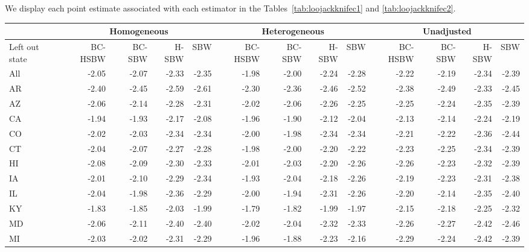 We display each point estimate associated with each estimator in the Tables~\ref{tab:loojackknifec1} and \ref{tab:loojackknifec2}.

\begin{landscape}
\captionsetup[table]{labelformat=empty,skip=1pt}
\begin{table}[H]\caption{Leave one state out jackknife point estimates: all estimators, primary dataset}\label{tab:loojackknifec1}
\centering
\begin{longtable}{lrrrr|rrrr|rrrr}
\hline
 & \multicolumn{4}{c}{Homogeneous} & \multicolumn{4}{c}{Heterogeneous} & \multicolumn{4}{c}{Unadjusted} \\ 
 \hline
Left out state & BC-HSBW & BC-SBW & H-SBW & SBW & BC-HSBW & BC-SBW & H-SBW & SBW & BC-HSBW & BC-SBW & H-SBW & SBW \\ 
\hline
All & -2.05 & -2.07 & -2.33 & -2.35 & -1.98 & -2.00 & -2.24 & -2.28 & -2.22 & -2.19 & -2.34 & -2.39 \\ 
AR & -2.40 & -2.45 & -2.59 & -2.61 & -2.30 & -2.36 & -2.46 & -2.52 & -2.38 & -2.49 & -2.33 & -2.45 \\ 
AZ & -2.06 & -2.14 & -2.28 & -2.31 & -2.02 & -2.06 & -2.26 & -2.25 & -2.25 & -2.24 & -2.35 & -2.39 \\ 
CA & -1.94 & -1.93 & -2.17 & -2.08 & -1.96 & -1.90 & -2.12 & -2.04 & -2.13 & -2.14 & -2.24 & -2.19 \\ 
CO & -2.02 & -2.03 & -2.34 & -2.34 & -2.00 & -1.98 & -2.34 & -2.34 & -2.21 & -2.22 & -2.36 & -2.44 \\ 
CT & -2.04 & -2.07 & -2.27 & -2.28 & -1.98 & -2.00 & -2.20 & -2.22 & -2.23 & -2.25 & -2.34 & -2.39 \\ 
HI & -2.08 & -2.09 & -2.30 & -2.33 & -2.01 & -2.03 & -2.20 & -2.26 & -2.26 & -2.23 & -2.32 & -2.39 \\ 
IA & -2.01 & -2.10 & -2.29 & -2.34 & -1.93 & -2.04 & -2.18 & -2.26 & -2.19 & -2.23 & -2.31 & -2.38 \\ 
IL & -2.04 & -1.98 & -2.36 & -2.29 & -2.00 & -1.94 & -2.31 & -2.26 & -2.20 & -2.14 & -2.35 & -2.40 \\ 
KY & -1.83 & -1.85 & -2.03 & -1.99 & -1.79 & -1.82 & -1.99 & -1.97 & -2.15 & -2.18 & -2.25 & -2.32 \\ 
MD & -2.06 & -2.11 & -2.40 & -2.40 & -2.02 & -2.04 & -2.32 & -2.33 & -2.26 & -2.27 & -2.42 & -2.46 \\ 
MI & -2.03 & -2.02 & -2.31 & -2.29 & -1.96 & -1.88 & -2.23 & -2.16 & -2.29 & -2.24 & -2.42 & -2.39 \\ 

\end{longtable}
\end{table}
\end{landscape}
